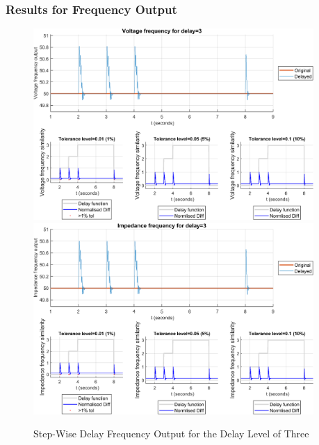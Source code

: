 \subsubsection{Results for Frequency Output}


\begin{figure}
    \caption{Step-Wise Delay Frequency Output for the Delay Level of Three}
    \includegraphics[width=0.95\textwidth]{PMUsim-figures/DelayOf_3/Step_vFrequency.png}    
    \label{fig:PMUsimStep_Three_vFrequency}
    \includegraphics[width=0.95\textwidth]{PMUsim-figures/DelayOf_3/Step_iFrequency.png}    
    \label{fig:PMUsimStep_Three_Frequency}
        \begin{small}
     \end{small}
\end{figure}


